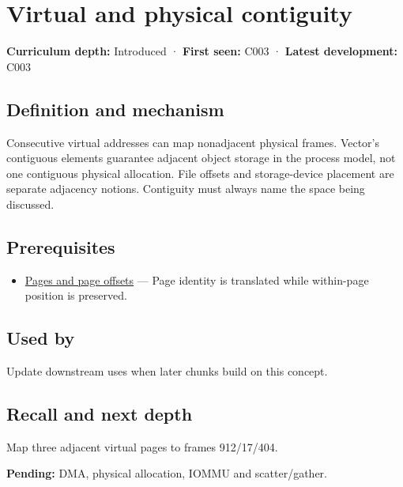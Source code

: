 \hypertarget{appendix-f897c1ddac8f}{}
\section{Virtual and physical contiguity}\label{appendix-f897c1ddac8f-virtual-and-physical-contiguity}

\textbf{Curriculum depth:} Introduced · \textbf{First seen:} C003 · \textbf{Latest development:} C003

\subsection{Definition and mechanism}\label{appendix-f897c1ddac8f-definition-and-mechanism}

Consecutive virtual addresses can map nonadjacent physical frames. Vector's contiguous elements guarantee adjacent object storage in the process model, not one contiguous physical allocation. File offsets and storage-device placement are separate adjacency notions. Contiguity must always name the space being discussed.

\subsection{Prerequisites}\label{appendix-f897c1ddac8f-prerequisites}

\begin{itemize}
\tightlist
\item
  \hyperref[appendix-0c67cd5bf30a]{Pages and page offsets} --- Page identity is translated while within-page position is preserved.
\end{itemize}

\subsection{Used by}\label{appendix-f897c1ddac8f-used-by}

Update downstream uses when later chunks build on this concept.

\subsection{Recall and next depth}\label{appendix-f897c1ddac8f-recall-and-next-depth}

Map three adjacent virtual pages to frames 912/17/404.

\textbf{Pending:} DMA, physical allocation, IOMMU and scatter/gather.

